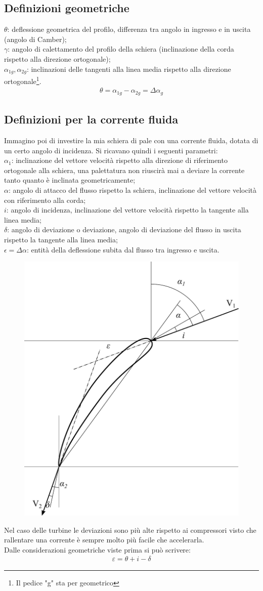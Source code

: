 \subsection{Definizioni geometriche}
$\theta$: deflessione geometrica del profilo, differenza tra angolo in ingresso e in uscita (angolo di Camber);\\
$\gamma$: angolo di calettamento del profilo della schiera (inclinazione della corda rispetto alla direzione ortogonale);\\
$\alpha_{1g}, \alpha_{2g}$: inclinazioni delle tangenti alla linea media rispetto alla direzione ortogonale\footnote{Il pedice "g" sta per geometrico}.
\begin{align*}
\theta = \alpha_{1g} - \alpha_{2g} = \Delta \alpha_{g}
\end{align*}
\subsection{Definizioni per la corrente fluida}
Immagino poi di investire la mia schiera di pale con una corrente fluida, dotata di un certo angolo di incidenza. Si ricavano quindi i seguenti parametri:\\[1mm]
$\alpha_1$: inclinazione del vettore velocità rispetto alla direzione di riferimento ortogonale alla schiera, una palettatura non riuscirà mai a deviare la corrente tanto quanto è inclinata geometricamente;\\
$\alpha$: angolo di attacco del flusso rispetto la schiera, inclinazione del vettore velocità con riferimento alla corda;\\
$i$: angolo di incidenza, inclinazione del vettore velocità rispetto la tangente alla linea media;\\
$\delta$: angolo di deviazione o deviazione, angolo di deviazione del flusso in uscita rispetto la tangente alla linea media;\\
$\epsilon = \Delta \alpha$: entità della deflessione subita dal flusso tra ingresso e uscita.\\[2mm]
\begin{figure}
\centering
  \includegraphics[width=.45\textwidth]{fig/palasing.pdf}
\caption{}
\label{fig:palasing}
\end{figure}
Nel caso delle turbine le deviazioni sono più alte rispetto ai compressori visto che rallentare una corrente è sempre molto più facile che accelerarla.\\
Dalle considerazioni geometriche viste prima si può scrivere:
\begin{align*}
\varepsilon = \theta + i - \delta
\end{align*}

